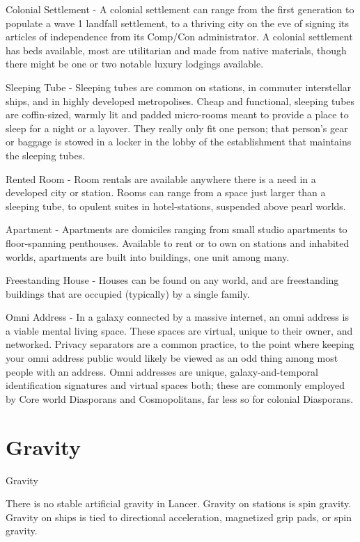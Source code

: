Colonial Settlement - A colonial settlement can range from the first generation to populate a
wave 1 landfall settlement, to a thriving city on the eve of signing its articles of independence
from its Comp/Con administrator. A colonial settlement has beds available, most are utilitarian
and made from native materials, though there might be one or two notable luxury lodgings
available.



Sleeping Tube - Sleeping tubes are common on stations, in commuter interstellar ships, and in
highly developed metropolises. Cheap and functional, sleeping tubes are coffin-sized, warmly lit
and padded micro-rooms meant to provide a place to sleep for a night or a layover. They really
only fit one person; that person’s gear or baggage is stowed in a locker in the lobby of the
establishment that maintains the sleeping tubes.


Rented Room - Room rentals are available anywhere there is a need in a developed city or
station. Rooms can range from a space just larger than a sleeping tube, to opulent suites in
hotel-stations, suspended above pearl worlds.



Apartment  - Apartments are domiciles ranging from small studio apartments to floor-spanning
penthouses. Available to rent or to own on stations and inhabited worlds, apartments are built
into buildings, one unit among many.


Freestanding House - Houses can be found on any world, and are freestanding buildings that are
occupied (typically) by a single family.


Omni Address - In a galaxy connected by a massive internet, an omni address is a viable mental
living space. These spaces are virtual, unique to their owner, and networked. Privacy separators
are a common practice, to the point where keeping your omni address public would likely be
viewed as an odd thing among most people with an address. Omni addresses are unique,
galaxy-and-temporal identification signatures and virtual spaces both; these are commonly
employed by Core world Diasporans and Cosmopolitans, far less so for colonial Diasporans.




\section{Gravity}
Gravity

There is no stable artificial gravity in Lancer. Gravity on stations is spin gravity. Gravity on ships is
tied to directional acceleration, magnetized grip pads, or spin gravity.


